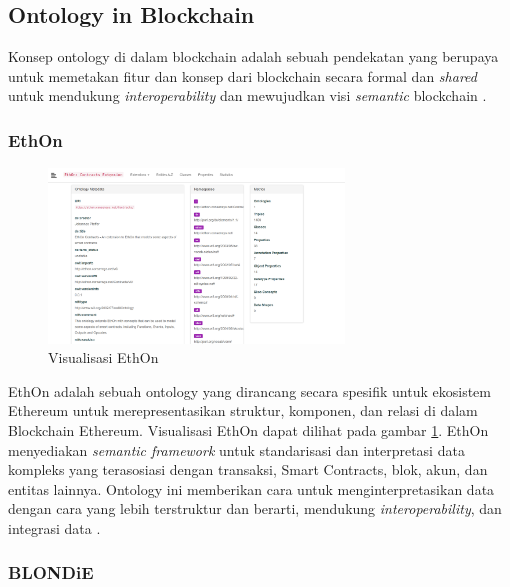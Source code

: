 \subsection{Ontology in Blockchain}
\label{subsec:ontology-in-blockchain}

Konsep ontology di dalam blockchain adalah sebuah pendekatan yang berupaya untuk memetakan fitur dan konsep dari blockchain secara formal dan \textit{shared} untuk mendukung \textit{interoperability} \parencite{9770809} dan mewujudkan visi \textit{semantic} blockchain \parencite{hector2020blondie}.

\subsubsection{EthOn}
\label{subsubsec:ethon}

\begin{figure}[ht]
	\centering
	\includegraphics[width=0.7\textwidth]{resources/chapter-2/ethon.png}
	\caption{Visualisasi EthOn \parencite{ethon2024}}
	\label{image:ethon}
\end{figure}

EthOn adalah sebuah ontology yang dirancang secara spesifik untuk ekosistem Ethereum untuk merepresentasikan struktur, komponen, dan relasi di dalam Blockchain Ethereum. Visualisasi EthOn dapat dilihat pada gambar \ref{image:ethon}. EthOn menyediakan \textit{semantic framework} untuk standarisasi dan interpretasi data kompleks yang terasosiasi dengan transaksi, Smart Contracts, blok, akun, dan entitas lainnya. Ontology ini memberikan cara untuk menginterpretasikan data dengan cara yang lebih terstruktur dan berarti, mendukung \textit{interoperability}, dan integrasi data \parencite{pfeffer2016ethon}.

\subsubsection{BLONDiE}
\label{subsubsec:blondie}

